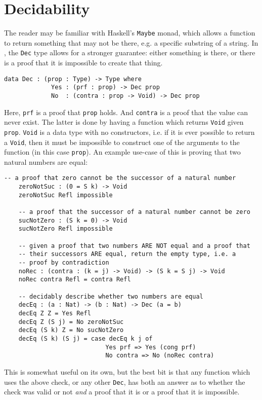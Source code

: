 \section{Decidability}
	The reader may be familiar with Haskell's \texttt{Maybe} monad, which allows a function to return something that may not be there, e.g. a specific substring of a string. In \Idris, the \texttt{Dec} type allows for a stronger guarantee: either something is there, or there is a proof that it is impossible to create that thing.
	\begin{lstlisting}[caption={\texttt{Dec} as defined in the \Idris prelude \cite{brady_2017}}]
        data Dec : (prop : Type) -> Type where
             Yes : (prf : prop) -> Dec prop
             No  : (contra : prop -> Void) -> Dec prop
	\end{lstlisting}
    Here, \texttt{prf} is a proof that \texttt{prop} holds. And \texttt{contra} is a proof that the value can never exist. The latter is done by having a function which returns \texttt{Void} given \texttt{prop}. \texttt{Void} is a data type with no constructors, i.e. if it is ever possible to return a \texttt{Void}, then it must be impossible to construct one of the arguments to the function (in this case \texttt{prop}). An example use-case of this is proving that two natural numbers are equal:
	\begin{lstlisting}[caption={Proving the equality between natural numbers \cite{brady_2017}},label={lst:decEq}]
    -- a proof that zero cannot be the successor of a natural number
    zeroNotSuc : (0 = S k) -> Void
    zeroNotSuc Refl impossible
    
    -- a proof that the successor of a natural number cannot be zero
    sucNotZero : (S k = 0) -> Void
    sucNotZero Refl impossible
    
    -- given a proof that two numbers ARE NOT equal and a proof that
    -- their successors ARE equal, return the empty type, i.e. a
    -- proof by contradiction
    noRec : (contra : (k = j) -> Void) -> (S k = S j) -> Void
    noRec contra Refl = contra Refl

    -- decidably describe whether two numbers are equal
    decEq : (a : Nat) -> (b : Nat) -> Dec (a = b)
    decEq Z Z = Yes Refl
    decEq Z (S j) = No zeroNotSuc
    decEq (S k) Z = No sucNotZero
    decEq (S k) (S j) = case decEq k j of
                            Yes prf => Yes (cong prf)
                            No contra => No (noRec contra)
	\end{lstlisting}
    This is somewhat useful on its own, but the best bit is that any function which uses the above check, or any other \texttt{Dec}, has both an answer as to whether the check was valid or not \textit{and} a proof that it is or a proof that it is impossible.

